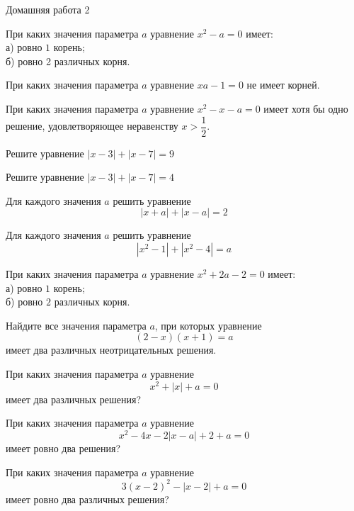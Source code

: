 \begin{homework}[number=2]
	\begin{listofex}
		\item Домашняя работа 2
	\end{listofex}
\end{homework}

\begin{class}[number=5]
	\begin{listofex}
		\item При каких значения параметра \( a \) уравнение \( x^2-a=0 \) имеет:\\
		а) ровно \( 1 \) корень;\\
		б) ровно 2 различных корня.
		\item При каких значения параметра \( a \) уравнение \( xa-1=0 \) не имеет корней.
		\item При каких значения параметра \( a \) уравнение \( x^2-x-a=0 \) имеет хотя бы одно решение, удовлетворяющее неравенству \( x>\dfrac{1}{2} \).
		\item Решите уравнение \( |x-3|+|x-7|=9 \)
		\item Решите уравнение \( |x-3|+|x-7|=4 \)
		\item Для каждого значения \( a \) решить уравнение
		\[ |x+a|+|x-a|=2 \]
		\item Для каждого значения \( a \) решить уравнение
		\[ |x^2-1|+|x^2-4|=a \]
	\end{listofex}
\end{class}

\begin{class}[number=6]
	\begin{listofex}
		\item При каких значения параметра \( a \) уравнение \( x^2+2a-2=0 \) имеет:\\
		а) ровно \( 1 \) корень;\\
		б) ровно \( 2 \) различных корня.
		\item Найдите все значения параметра \( a \), при которых уравнение
		\[ (2-x)(x+1)=a \]
		имеет два различных неотрицательных решения.
		\item При каких значения параметра \( a \) уравнение
		\[ x^2+|x|+a=0 \]
		имеет два различных решения?
		\item При каких значения параметра \( a \) уравнение
		\[ x^2-4x-2|x-a|+2+a=0 \]
		имеет ровно два решения?
		\item При каких значения параметра \( a \) уравнение
		\[ 3(x-2)^2 - |x-2|+a=0 \]
		имеет ровно два различных решения?
	\end{listofex}
\end{class}

